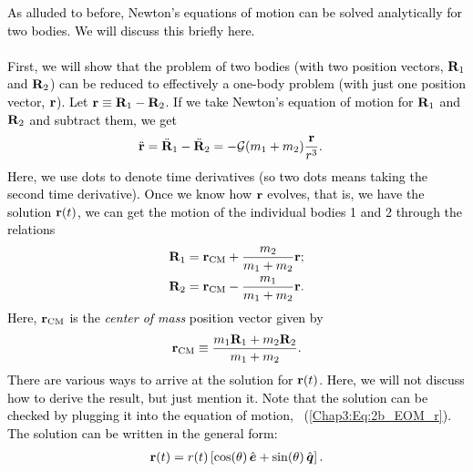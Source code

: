 \documentclass[main.tex]{subfiles}
\begin{document}
\begin{tcolorbox}[sharp corners, colback=blue!30, colframe=blue!80!blue, title=Box \refstepcounter{educhap3}\label{boxchap3:dynIII}\ref{boxchap3:dynIII} -- Orbital Dynamics III]
\par \textcolor{black}{As alluded to before, Newton's equations of motion can be solved analytically for two bodies. We will discuss this briefly here. \\ \\
First, we will show that the problem of two bodies (with two position vectors, ${\mathbf{R}}_1$ and ${\mathbf{R}}_2$) can be reduced to effectively a one-body problem (with just one position vector, ${\mathbf{r}}$). Let ${\mathbf{r}} \equiv {\mathbf{R}}_1 - {\mathbf{R}}_2$. If we take Newton's equation of motion for ${\mathbf{R}}_1$ and ${\mathbf{R}}_2$ and subtract them, we get
\begin{align}
\label{Chap3:Eq:2b_EOM_r}
\ddot{{\mathbf{r}}} &= \ddot{{\mathbf{R}}}_1 - \ddot{{\mathbf{R}}}_2 =  -\mathcal{G} (m_1+m_2)  \frac{{\mathbf{r}}}{r^3}.
\end{align}
Here, we use dots to denote time derivatives (so two dots means taking the second time derivative). Once we know how ${\mathbf{r}}$ evolves, that is, we have the solution ${\mathbf{r}}(t)$, we can get the motion of the individual bodies 1 and 2 through the relations
\begin{subequations}
\label{Chap3:Eq:R_r_relations}
\begin{align}
{\mathbf{R}}_1 &= {\mathbf{r}}_\mathrm{CM} + \frac{m_2}{m_1+m_2} {\mathbf{r}}; \\
{\mathbf{R}}_2 &= {\mathbf{r}}_\mathrm{CM} - \frac{m_1}{m_1+m_2} {\mathbf{r}}.
\end{align}
\end{subequations}
Here, ${\mathbf{r}}_\mathrm{CM}$ is the {\it center of mass} position vector given by
\begin{align}
\label{Chap3:Eq:r_CM_def}
{\mathbf{r}}_\mathrm{CM} \equiv \frac{m_1 {\mathbf{R}}_1 + m_2 {\mathbf{R}}_2}{m_1+m_2}.
\end{align} 
There are various ways to arrive at the solution for ${\mathbf{r}}(t)$. Here, we will not discuss how to derive the result, but just mention it. Note that the solution can be checked by plugging it into the equation of motion, \Eq~(\ref{Chap3:Eq:2b_EOM_r}). The solution can be written in the general form:
\begin{align}
\label{Chap3:Eq:r_sol}
{\mathbf{r}}(t) = r(t) \left [ \cos(\theta) \, \hat{\boldsymbol{e}} + \sin(\theta) \, \hat{\boldsymbol{q}} \right ].
\end{align}
}
\end{tcolorbox}
\end{document}
